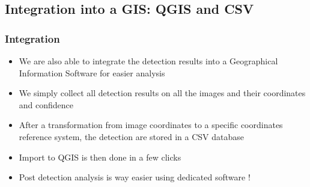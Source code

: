 \documentclass[aspectratio=169]{beamer}
\begin{document}
\subsection{Integration into a GIS: QGIS and CSV}
\begin{frame}
	\frametitle{Integration}
	\begin{itemize}
		\item We are also able to integrate the detection results into a Geographical Information Software for easier analysis
		\item We simply collect all detection results on all the images and their coordinates and confidence
		\item After a transformation from image coordinates to a specific coordinates reference system, the detection are stored in a CSV database
		\item Import to QGIS\cite{QGIS_software} is then done in a few clicks
		\item Post detection analysis is way easier using dedicated software ! 
	\end{itemize}
\end{frame}
\end{document}
